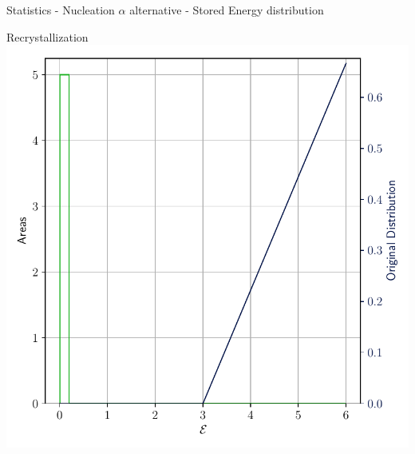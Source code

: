 \documentclass[usenames,dvipsnames]{beamer}
\begin{document}
\begin{frame}{Statistics - Nucleation $\alpha$ alternative - Stored Energy distribution}
\begin{minipage}{0.5\textwidth}
    \end{minipage}%
    \begin{minipage}{0.5\textwidth}
    \centering
    \scriptsize
    Recrystallization
    \includegraphics[trim={0 1em 0 1.1em},clip=true,scale=0.35]{figures/stored_energy/SE/se/000240_nuclalternative_set.pdf}
    \end{minipage}
\end{frame}

\end{document}
